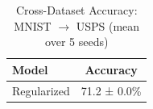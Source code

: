 
\begin{table}[h]
\centering
\caption{Cross-Dataset Accuracy: MNIST $\rightarrow$ USPS (mean over 5 seeds)}
\label{tab:extension2_usps}
\begin{tabular}{lc}
\toprule
\textbf{Model} & \textbf{Accuracy} \\
\midrule
Regularized & 71.2 ± 0.0\% \\
\bottomrule
\end{tabular}
\end{table}
